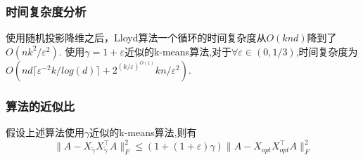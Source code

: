 \documentclass{ctexart}
\begin{document}
    \subsubsection{时间复杂度分析}
    使用随机投影降维之后，Lloyd算法一个循环的时间复杂度从$O(knd)$降到了$O(nk^2/\varepsilon^2)$.
    使用$\gamma = 1 + \varepsilon$近似的k-means算法,对于$\forall \varepsilon \in (0, 1/3)$,时间复杂度为$O(nd\lceil\varepsilon^{-2}k/log(d)\rceil + 2^{(k/\varepsilon)^{O(1)}}kn/\varepsilon^2)$.

    \subsubsection{算法的近似比}
    假设上述算法使用$\gamma$近似的k-means算法,则有
    \begin{equation*}
        \| A - X_{\tilde{\gamma}}X_{\tilde{\gamma}}^{\top}A \|_{F}^2 \le (1+(1+\varepsilon)\gamma) \| A - X_{opt}X_{opt}^{\top}A \|_{F}^2
    \end{equation*}
\end{document}
